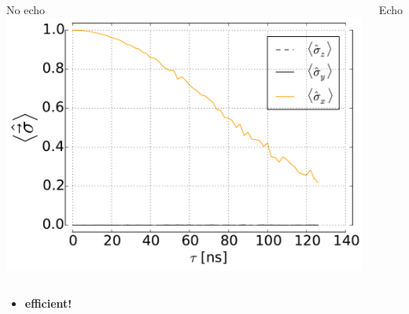 \documentclass[aspectratio=169, 13pt, t]{beamer}
\begin{document}
\begin{frame}[t]
{\begin{columns}[c]
	No echo
	\centering
	\includegraphics[width=\textwidth]{deph_pink_se}
	
	Echo
	\end{columns}
	
	
	\vspace{0.2cm}
	\begin{itemize}
	\centering	
	\item \bf efficient!
	\end{itemize}
}
\end{frame}
\end{document}
